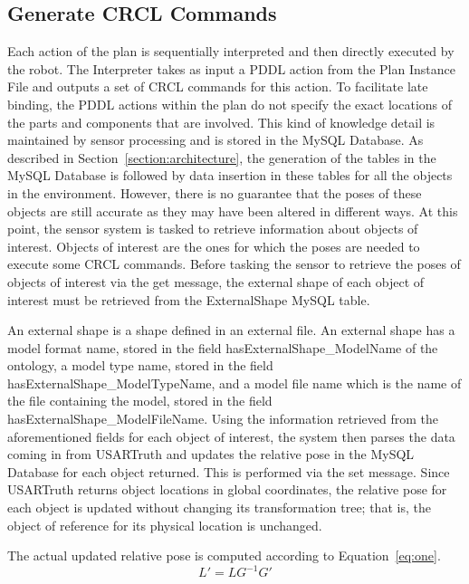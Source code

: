 \subsection{Generate CRCL Commands}
\label{subsection:CRCL}
Each action of the plan is sequentially interpreted and then directly executed by the robot. The \textsf{Interpreter} takes as input a PDDL action from the \textsf{Plan Instance File} and outputs a set of CRCL commands for this action. To facilitate late binding, the PDDL actions within the plan  do not specify the exact locations of the parts and components that are involved. This kind of knowledge detail is maintained by sensor processing and is stored in the \textsf{MySQL Database}. As described in Section~\ref{section:architecture}, the generation of the tables in the \textsf{MySQL Database} is followed by data insertion in these tables for all the objects in the environment. However, there is no guarantee that the poses of these objects are still accurate as they may have been altered in different ways. At this point, the sensor system is tasked to retrieve information about objects of interest. Objects of interest are the ones for which the poses are needed to execute some CRCL commands. Before tasking the sensor to retrieve the poses of objects of interest via the \textsf{get} message, the external shape of each object of interest must be retrieved from the \textsf{ExternalShape} MySQL table.

An external shape is a shape defined in an external file. An external shape has a model format name, stored in the field \textsf{hasExternalShape\_ModelName} of the ontology, a model type name, stored in the field \textsf{hasExternalShape\_ModelTypeName}, and a model file name which is the name of the file containing the model, stored in the field \textsf{hasExternalShape\_ModelFileName}. Using the information retrieved from the aforementioned fields for each object of interest, the system then parses the data coming in from USARTruth and updates the relative pose in the \textsf{MySQL Database} for each object returned. This is performed via the \textsf{set} message. Since USARTruth returns object locations in global coordinates, the relative pose for each object is updated without changing its transformation tree; that is, the object of reference for its physical location is unchanged.


The actual updated relative pose is computed according to Equation~\ref{eq:one}.
 \begin{equation}
\label{eq:one}
 L' = LG^{-1}G'
 \end{equation}

